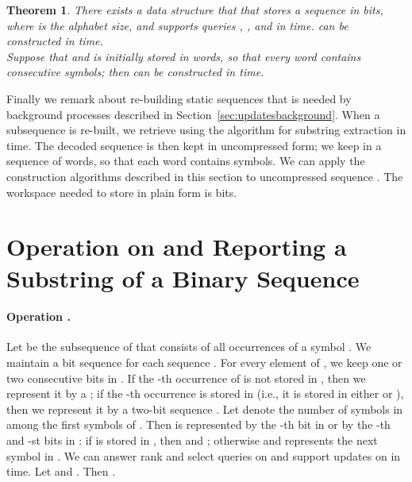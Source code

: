 \documentclass[11pt]{article}\usepackage{fullpage}
\newtheorem{theorem}{Theorem}
\begin{document}
\begin{theorem}
  \label{theor:static}
There exists a data structure   that that stores a sequence  in   bits, where  is the alphabet size,  and supports queries , , and  in  time.   can be constructed in  time. \\
Suppose that  and  is initially stored in  words, so that every word contains  consecutive symbols; then  can be constructed in  time.  
\end{theorem}
Finally we remark about re-building static sequences that is needed by background processes described in Section~\ref{sec:updatesbackground}. When a subsequence  is re-built, we retrieve  using the algorithm for substring extraction in  time. The decoded sequence  
is then kept in uncompressed form; we keep  in a sequence of words, so that each word contains  symbols. We can apply the construction algorithms described in this section to uncompressed sequence . The workspace needed to store  in plain form is  bits. 



\section{Operation  on  and Reporting a Substring of a Binary Sequence}
\label{sec:appselprime}
\paragraph{Operation .}
Let  be the subsequence of  that consists of all occurrences of a symbol . 
We maintain a bit sequence  for each sequence . 
For every element of , we keep one or two consecutive bits 
in . If the -th occurrence of  is not stored in , then we represent it by a ; if the -th occurrence 
is stored in  (i.e., it is stored in either  or ), then we represent it by 
a two-bit sequence . Let  denote the number of symbols in  among the first  symbols of . Then  is represented by the -th bit in  or by the -th and  -st bits in : if  is stored 
in , then  and ; otherwise 
 and  represents the next symbol in . We can answer rank and select queries on  and support updates on  in  time. 
Let  and . Then 
.  
\end{document}
